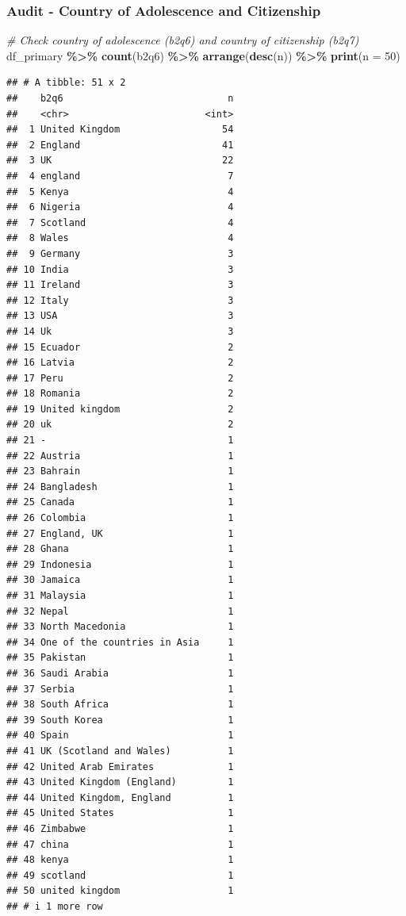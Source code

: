 \documentclass[
]{article}
\newenvironment{Shaded}{\begin{snugshade}}{\end{snugshade}}
\newcommand{\AttributeTok}[1]{\textcolor[rgb]{0.13,0.29,0.53}{#1}}
\newcommand{\CommentTok}[1]{\textcolor[rgb]{0.56,0.35,0.01}{\textit{#1}}}
\newcommand{\DecValTok}[1]{\textcolor[rgb]{0.00,0.00,0.81}{#1}}
\newcommand{\FunctionTok}[1]{\textcolor[rgb]{0.13,0.29,0.53}{\textbf{#1}}}
\newcommand{\NormalTok}[1]{#1}
\newcommand{\SpecialCharTok}[1]{\textcolor[rgb]{0.81,0.36,0.00}{\textbf{#1}}}
\begin{document}
\subsubsection{Audit - Country of Adolescence and
Citizenship}\label{audit---country-of-adolescence-and-citizenship}

\begin{Shaded}
\begin{Highlighting}[]
\CommentTok{\# Check country of adolescence (b2q6) and country of citizenship (b2q7)}
\NormalTok{df\_primary }\SpecialCharTok{\%\textgreater{}\%} \FunctionTok{count}\NormalTok{(b2q6) }\SpecialCharTok{\%\textgreater{}\%} \FunctionTok{arrange}\NormalTok{(}\FunctionTok{desc}\NormalTok{(n)) }\SpecialCharTok{\%\textgreater{}\%} \FunctionTok{print}\NormalTok{(}\AttributeTok{n =} \DecValTok{50}\NormalTok{)}
\end{Highlighting}
\end{Shaded}

\begin{verbatim}
## # A tibble: 51 x 2
##    b2q6                             n
##    <chr>                        <int>
##  1 United Kingdom                  54
##  2 England                         41
##  3 UK                              22
##  4 england                          7
##  5 Kenya                            4
##  6 Nigeria                          4
##  7 Scotland                         4
##  8 Wales                            4
##  9 Germany                          3
## 10 India                            3
## 11 Ireland                          3
## 12 Italy                            3
## 13 USA                              3
## 14 Uk                               3
## 15 Ecuador                          2
## 16 Latvia                           2
## 17 Peru                             2
## 18 Romania                          2
## 19 United kingdom                   2
## 20 uk                               2
## 21 -                                1
## 22 Austria                          1
## 23 Bahrain                          1
## 24 Bangladesh                       1
## 25 Canada                           1
## 26 Colombia                         1
## 27 England, UK                      1
## 28 Ghana                            1
## 29 Indonesia                        1
## 30 Jamaica                          1
## 31 Malaysia                         1
## 32 Nepal                            1
## 33 North Macedonia                  1
## 34 One of the countries in Asia     1
## 35 Pakistan                         1
## 36 Saudi Arabia                     1
## 37 Serbia                           1
## 38 South Africa                     1
## 39 South Korea                      1
## 40 Spain                            1
## 41 UK (Scotland and Wales)          1
## 42 United Arab Emirates             1
## 43 United Kingdom (England)         1
## 44 United Kingdom, England          1
## 45 United States                    1
## 46 Zimbabwe                         1
## 47 china                            1
## 48 kenya                            1
## 49 scotland                         1
## 50 united kingdom                   1
## # i 1 more row
\end{verbatim}
\end{document}
